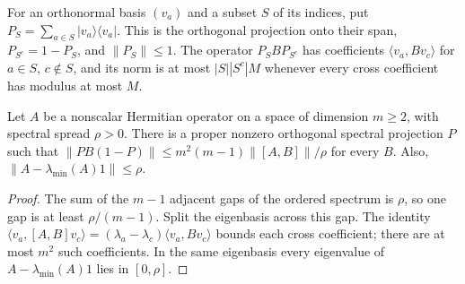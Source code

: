 \begin{definition}
    \label{def:hastings05_basis_split_projection}
    \leanok
    For an orthonormal basis $(v_a)$ and a subset $S$ of its indices, put
    $P_S=\sum_{a\in S}|v_a\rangle\langle v_a|$. This is the orthogonal
    projection onto their span, $P_{S^c}=1-P_S$, and $\|P_S\|\le1$.
    The operator $P_SBP_{S^c}$ has coefficients
    $\langle v_a,Bv_c\rangle$ for $a\in S$, $c\notin S$, and its norm is
    at most $|S||S^c|M$ whenever every cross coefficient has modulus at most $M$.
\end{definition}

\begin{lemma}
    \label{thm:hastings05_spectral_split}
    \leanok
    Let $A$ be a nonscalar Hermitian operator on a space of dimension
    $m\ge2$, with spectral spread $\rho>0$. There is a proper nonzero
    orthogonal spectral projection $P$ such that
    $\|PB(1-P)\|\le m^2(m-1)\|[A,B]\|/\rho$ for every $B$.
    Also, $\|A-\lambda_{\min}(A)1\|\le\rho$.
\end{lemma}
\begin{proof}\leanok
    The sum of the $m-1$ adjacent gaps of the ordered spectrum is $\rho$,
    so one gap is at least $\rho/(m-1)$. Split the eigenbasis across this
    gap. The identity
    $\langle v_a,[A,B]v_c\rangle=(\lambda_a-\lambda_c)\langle v_a,Bv_c\rangle$
    bounds each cross coefficient; there are at most $m^2$ such coefficients.
    In the same eigenbasis every eigenvalue of
    $A-\lambda_{\min}(A)1$ lies in $[0,\rho]$.
\end{proof}


